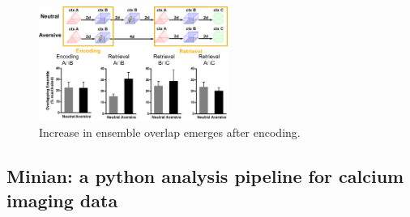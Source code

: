 \documentclass[master.tex]{subfiles}
\begin{document}
\begin{figure}
  \centering
  \includegraphics[width=0.55\textwidth]{Figures/val_retro_prelim_imag.pdf}
  \caption{\footnotesize Increase in ensemble overlap emerges after encoding.}
  \label{fig:prelim_val_imag}
  \vspace{-25pt}
\end{figure}
\subsection*{Minian: a python analysis pipeline for calcium imaging data}
\end{document}
